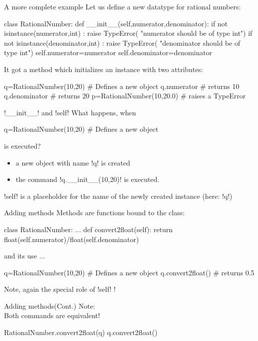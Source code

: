 \documentclass[hyperref={pdfpagelabels=false},table]{beamer}
\begin{document}
\begin{frame}[fragile]{A more complete example}
Let us define a new datatype for rational numbers:
\begin{python}
class RationalNumber:
    def __init__(self,numerator,denominator):
        if not isinstance(numerator,int) :
             raise TypeError(
                   "numerator should be of type int")
        if not isinstance(denominator,int) :
             raise TypeError(
                   "denominator should be of type int")
        self.numerator=numerator
        self.denominator=denominator
\end{python}
\vfill
It got a method which initializes an instance with two attributes:
\vfill
\begin{python}
q=RationalNumber(10,20)    # Defines a new object
q.numerator                # returns 10
q.denominator              # returns 20
p=RationalNumber(10,20.0)  # raises a TypeError
\end{python}

\end{frame}
\begin{frame}[fragile]{\pyth!__init__! and \pyth!self!}
What happens, when
\begin{python}
q=RationalNumber(10,20)    # Defines a new object
\end{python}
is executed?
\vfill
\begin{itemize}
\item a new object with name \pyth!q! is created
\item the command \pyth!q.__init__(10,20)! is executed.
\end{itemize}
\vfill
\pyth!self! is a placeholder for the name of the newly created instance (here: \pyth!q!)
\vfill

\end{frame}
\begin{frame}[fragile]{Adding methods}
Methods are functions bound to the class:
\vfill
\begin{python}
class RationalNumber:
...
  def convert2float(self):
    return float(self.numerator)/float(self.denominator)
\end{python}
\vfill
and its use ...
\begin{python}
q=RationalNumber(10,20)   # Defines a new object
q.convert2float()         # returns 0.5
\end{python}
\vfill
Note, again the special role of \pyth!self! !
\end{frame}
\begin{frame}[fragile]{Adding methods\hfill (Cont.)}
\vfill
Note: \\
Both commands are equivalent!
\begin{python}
RationalNumber.convert2float(q)
q.convert2float()
\end{python}
\vfill
\end{frame}
\end{document}
